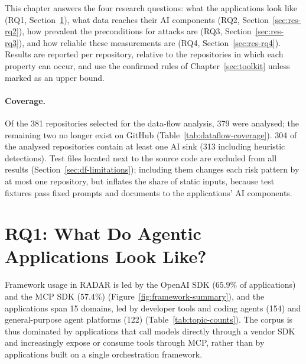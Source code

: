 \label{chap:results}

This chapter answers the four research questions: what the applications look like (RQ1, Section~\ref{sec:res-rq1}), what data reaches their AI components (RQ2, Section~\ref{sec:res-rq2}), how prevalent the preconditions for attacks are (RQ3, Section~\ref{sec:res-rq3}), and how reliable these measurements are (RQ4, Section~\ref{sec:res-rq4}). Results are reported per repository, relative to the repositories in which each property can occur, and use the confirmed rules of Chapter~\ref{sec:toolkit} unless marked as an upper bound.

\paragraph{Coverage.} Of the 381 repositories selected for the data-flow analysis, 379 were analysed; the remaining two no longer exist on GitHub (Table~\ref{tab:dataflow-coverage}). 304 of the analysed repositories contain at least one AI sink (313 including heuristic detections). Test files located next to the source code are excluded from all results (Section~\ref{sec:df-limitations}); including them changes each risk pattern by at most one repository, but inflates the share of static inputs, because test fixtures pass fixed prompts and documents to the applications' AI components.

\section{RQ1: What Do Agentic Applications Look Like?}
\label{sec:res-rq1}

Framework usage in RADAR is led by the OpenAI SDK ($65.9\%$ of applications) and the MCP SDK ($57.4\%$) (Figure~\ref{fig:framework-summary}), and the applications span 15 domains, led by developer tools and coding agents (154) and general-purpose agent platforms (122) (Table~\ref{tab:topic-counts}). The corpus is thus dominated by applications that call models directly through a vendor SDK and increasingly expose or consume tools through MCP, rather than by applications built on a single orchestration framework.

